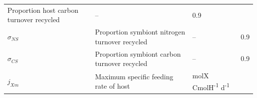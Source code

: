 \documentclass[]{elsarticle} %
\begin{document}
\begin{longtable}[c]{@{}llll@{}}
\begin{minipage}[t]{0.48\columnwidth}\raggedright\strut
Proportion host carbon turnover recycled
\strut\end{minipage} &
\begin{minipage}[t]{0.25\columnwidth}\raggedright\strut
--
\strut\end{minipage} &
\begin{minipage}[t]{0.10\columnwidth}\raggedright\strut
0.9
\strut\end{minipage}\tabularnewline
\begin{minipage}[t]{0.10\columnwidth}\raggedright\strut
\(\sigma_{NS}\)
\strut\end{minipage} &
\begin{minipage}[t]{0.48\columnwidth}\raggedright\strut
Proportion symbiont nitrogen turnover recycled
\strut\end{minipage} &
\begin{minipage}[t]{0.25\columnwidth}\raggedright\strut
--
\strut\end{minipage} &
\begin{minipage}[t]{0.10\columnwidth}\raggedright\strut
0.9
\strut\end{minipage}\tabularnewline
\begin{minipage}[t]{0.10\columnwidth}\raggedright\strut
\(\sigma_{CS}\)
\strut\end{minipage} &
\begin{minipage}[t]{0.48\columnwidth}\raggedright\strut
Proportion symbiont carbon turnover recycled
\strut\end{minipage} &
\begin{minipage}[t]{0.25\columnwidth}\raggedright\strut
--
\strut\end{minipage} &
\begin{minipage}[t]{0.10\columnwidth}\raggedright\strut
0.9
\strut\end{minipage}\tabularnewline
\begin{minipage}[t]{0.10\columnwidth}\raggedright\strut
\(j_{Xm}\)
\strut\end{minipage} &
\begin{minipage}[t]{0.48\columnwidth}\raggedright\strut
Maximum specific feeding rate of host
\strut\end{minipage} &
\begin{minipage}[t]{0.25\columnwidth}\raggedright\strut
molX CmolH\textsuperscript{-1} d\textsuperscript{-1}
\strut\end{minipage} &
\begin{minipage}[t]{0.10\columnwidth}\raggedright\strut

\end{minipage}
\end{longtable}
\end{document}
